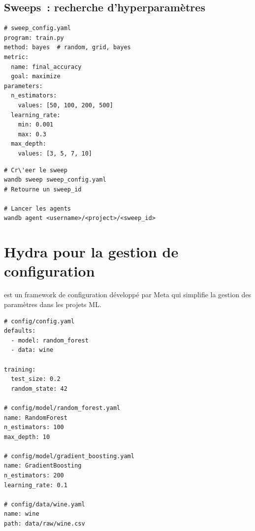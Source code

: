 \subsection{Sweeps~: recherche d'hyperparam\`etres}

\begin{codeblock}[title=\textbf{Configuration d'un Sweep W\&B}]
\begin{verbatim}
# sweep_config.yaml
program: train.py
method: bayes  # random, grid, bayes
metric:
  name: final_accuracy
  goal: maximize
parameters:
  n_estimators:
    values: [50, 100, 200, 500]
  learning_rate:
    min: 0.001
    max: 0.3
  max_depth:
    values: [3, 5, 7, 10]
\end{verbatim}
\end{codeblock}

\begin{codeblock}[title=\textbf{Lancer un Sweep}]
\begin{verbatim}
# Cr\'eer le sweep
wandb sweep sweep_config.yaml
# Retourne un sweep_id

# Lancer les agents
wandb agent <username>/<project>/<sweep_id>
\end{verbatim}
\end{codeblock}

\section{Hydra pour la gestion de configuration}
\label{sec:hydra}


 est un framework de configuration d\'evelopp\'e par Meta qui
simplifie la gestion des param\`etres dans les projets ML.

\begin{codeblock}[title=\textbf{Structure de configuration Hydra}]
\begin{verbatim}
# config/config.yaml
defaults:
  - model: random_forest
  - data: wine

training:
  test_size: 0.2
  random_state: 42

# config/model/random_forest.yaml
name: RandomForest
n_estimators: 100
max_depth: 10

# config/model/gradient_boosting.yaml
name: GradientBoosting
n_estimators: 200
learning_rate: 0.1

# config/data/wine.yaml
name: wine
path: data/raw/wine.csv
\end{verbatim}
\end{codeblock}

